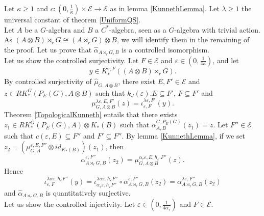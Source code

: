 \begin{dem} %
Let $\kappa\geq 1$ and $c : (0,\frac{1}{\kappa})\times\mathcal E\rightarrow \mathcal E$ as in lemma \ref{KunnethLemma}. Let $\lambda \geq 1$ the universal constant of theorem \ref{UniformQS}.\\

Let $A$ be a $G$-algebra and $B$ a $C^*$-algebra, seen as a $G$-algebra with trivial action. As $(A\otimes B)\rtimes_r G \cong (A\rtimes_r G)\otimes B$, we will identify them in the remaining of the proof. Let us prove that $\hat \alpha_{A\rtimes_r G,B}$ is a controlled isomorphism.\\


Let us show the controlled surjectivity. Let $F\in\mathcal E$ and $\varepsilon\in (0,\frac{1}{4 \kappa})$, and let \[y\in K^{\varepsilon,F}_*((A\otimes B)\rtimes_r G).\] By controlled surjectivity of $\hat\mu_{G,A\otimes B}$, there exist $E,F'\in\mathcal E$ and $z\in RK_*^G(P_E(G), A\otimes B) $ such that $k_J(\varepsilon).E\subseteq F'$, $F\subseteq F'$ and 
\[\mu_{G,A\otimes B}^{\lambda\varepsilon,E,F'}(z)=\iota_{\varepsilon,F}^{\lambda\varepsilon,F'}(y).\] 
Theorem \ref{TopologicalKunneth} entails that there exists $z_1 \in RK_*^G(P_E(G),A)\otimes K_*(B) $ such that $\alpha_{A,B}^{G,P_E(G)}(z_1)=z$. Let $F''\in \mathcal E$ such that $c(\varepsilon,E)\subseteq F''$ and $F'\subseteq F''$. By lemma \ref{KunnethLemma}, if we set $z_2=(\mu_{G,A}^{\varepsilon,E,F''} \otimes id_{ K_*(B)})(z_1)$, then 
\[\alpha_{A\rtimes_r G,B}^{\varepsilon,F''} (z_2)= \mu_{G,A\otimes B}^{\alpha_\tau \varepsilon,E,h_\varepsilon . F''}(z).\]
Hence \[\iota_{\varepsilon,F}^{\lambda \alpha \varepsilon,h_\varepsilon F''}(y)=\iota_{\alpha_\tau\varepsilon,h_\varepsilon F''}^{ \lambda \alpha \varepsilon,h_\varepsilon F''}\circ\alpha_{A\rtimes_r G,B}^{\varepsilon,F''} (z_2)=
\alpha_{A\rtimes_r G,B}^{\lambda \varepsilon,F''} (z_2)\] and $\hat \alpha_{A\rtimes_r G,B} $ is quantitatively surjective.\\

Let us show the controlled injectivity. Let $\varepsilon\in(0,\frac{1}{4\alpha_\tau})$ and $F\in\mathcal E$.\\ 


\end{dem}
